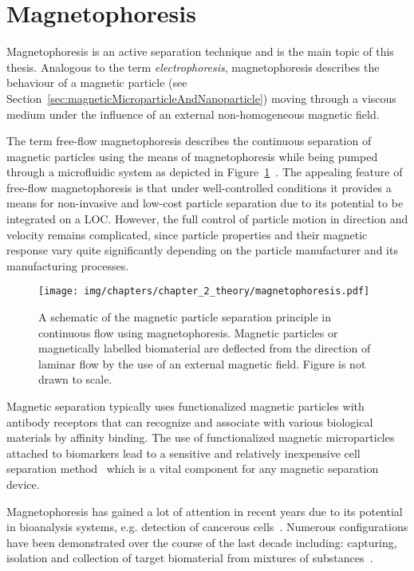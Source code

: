 \section{Magnetophoresis}\label{sec:magnetophoresis}
Magnetophoresis is an active separation technique and is the main topic of this thesis. Analogous to the term \textit{electrophoresis}, magnetophoresis describes the behaviour of a magnetic particle (see Section~\ref{sec:magneticMicroparticleAndNanoparticle}) moving through a viscous medium under the influence of an external non-homogeneous magnetic field. 

The term free-flow magnetophoresis describes the continuous separation of magnetic particles using the means of magnetophoresis while being pumped through a microfluidic system as depicted in Figure~\ref{fig:freeFlowMagnetophoresis}~\cite{Zborowski2015}. The appealing feature of free-flow magnetophoresis is that under well-controlled conditions it provides a means for non-invasive and low-cost particle separation due to its potential to be integrated on a LOC. However, the full control of particle motion in direction and velocity remains complicated, since particle properties and their magnetic response vary quite significantly depending on the particle manufacturer and its manufacturing processes.

\begin{figure}[htb]
\centering
\texttt{[image: img/chapters/chapter\_2\_theory/magnetophoresis.pdf]}
\caption[Schematic of magnetic particle separation principle using free-flow magnetophoresis]{A schematic of the magnetic particle separation principle in continuous flow using magnetophoresis. Magnetic particles or magnetically labelled biomaterial are deflected from the direction of laminar flow by the use of an external magnetic field. Figure is not drawn to scale.}
\label{fig:freeFlowMagnetophoresis}
\end{figure}

Magnetic separation typically uses functionalized magnetic particles with antibody receptors that can recognize and associate with various biological materials by affinity binding. The use of functionalized magnetic microparticles attached to biomarkers lead to a sensitive and relatively inexpensive cell separation method~\cite{Gijs2004,Pankhurst2003} which is a vital component for any magnetic separation device.

Magnetophoresis has gained a lot of attention in recent years due to its potential in bioanalysis systems, e.g. detection of cancerous cells~\cite{Zborowski2011}. Numerous configurations have been demonstrated over the course of the last decade including: capturing, isolation and collection of target biomaterial from mixtures of substances~\cite{Gijs2004,Friedman2005,Pamme2006,Yu2014}. 

